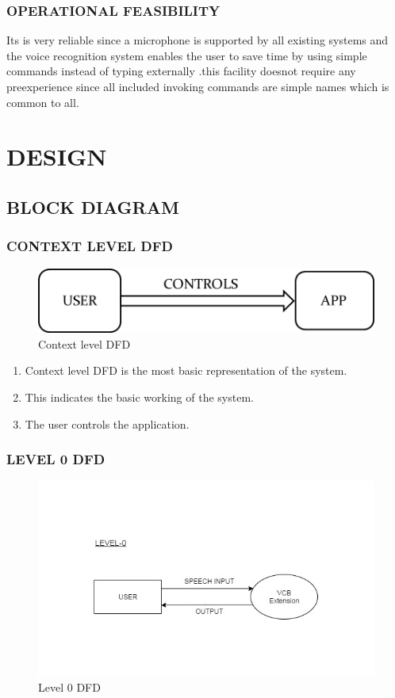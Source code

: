 \documentclass[11pt]{report} %
\begin{document}
\subsection{OPERATIONAL FEASIBILITY}
\label{subsec:OPERATIONAL FEASIBILITY}
Its is very reliable since a microphone is supported by all existing systems and the voice recognition system enables the user to save time by using simple commands instead of typing externally .this facility doesnot  require  any preexperience since all included invoking commands are simple names which is common to all.


\chapter{DESIGN}
\label{cha:DESIGN}


\section{BLOCK DIAGRAM}
\label{sec:DATA FLOW DIAGRAMS}

\subsection{CONTEXT LEVEL DFD}
\label{subsec:CONTEXT LEVEL DFD}

\begin{figure}[h]
	\centering
	\includegraphics[width=0.5\linewidth]{figures/context_level_DFD.png}
	\caption{Context level DFD}
	\label{fig:Context level DFD}
\end{figure}


\begin{enumerate}
	\item Context level DFD is the most basic representation of the system.
	\item This indicates the basic working of the system.
	\item The user controls the application.
\end{enumerate}


\subsection{LEVEL 0 DFD}
\label{subsec:LEVEL 0 DFD}
\begin{figure}[h]
	\centering
	\includegraphics[width=0.5\linewidth]{figures/DFD0.jpg}
	\caption{Level 0 DFD}
	\label{fig:Level 0 DFD}
\end{figure}
\end{document}
